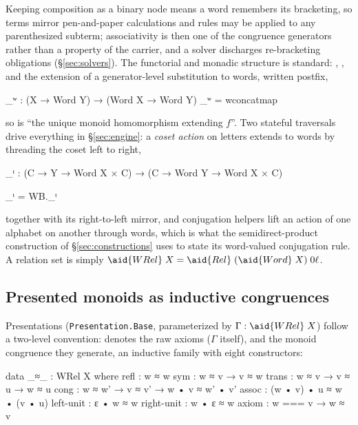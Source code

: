 Keeping composition as a binary node means a word remembers its
bracketing, so terms mirror pen-and-paper calculations and rules may be
applied to any parenthesized subterm; associativity is then one of the
congruence generators rather than a property of the carrier, and a
solver discharges re-bracketing obligations
(\S\ref{sec:solvers}).  The functorial and monadic structure is standard:
, , and the extension of a generator-level
substitution to words, written postfix,

\begin{code}
_ʷ : (X → Word Y) → (Word X → Word Y)
_ʷ = wconcatmap
\end{code}

\noindent so  is ``the unique monoid homomorphism extending $f$''.  Two
stateful traversals drive everything in \S\ref{sec:engine}: a \emph{coset
action} on letters extends to words by threading the coset left to right,

\begin{code}
_ᵗ : (C → Y → Word X × C) → (C → Word Y → Word X × C)
\end{code}
\begin{code}[hide]
_ᵗ = WB._ᵗ
\end{code}

\noindent together with its right-to-left mirror, and conjugation
helpers lift an action of one alphabet on another through words, which
is what the semidirect-product construction of \S\ref{sec:constructions}
uses to state its word-valued conjugation rule.  A relation set is simply
$\aid{WRel}\;X = \aid{Rel}\;(\aid{Word}\;X)\;0\ell$.

\subsection{Presented monoids as inductive congruences}\label{sec:presentations}

Presentations (\texttt{Presentation.Base}, parameterized by
$\Gamma : \aid{WRel}\;X$) follow a two-level convention:
\aid{{\_}==={\_}} denotes the raw axioms ($\Gamma$ itself), and
 the monoid congruence they generate,
an inductive family with eight constructors:

\begin{code}
data _≈_ : WRel X where
  refl  : w ≈ w
  sym   : w ≈ v → v ≈ w
  trans : w ≈ v → v ≈ u → w ≈ u
  cong  : w ≈ w' → v ≈ v' → w • v ≈ w' • v'
  assoc      : (w • v) • u ≈ w • (v • u)
  left-unit  : ε • w ≈ w
  right-unit : w • ε ≈ w
  axiom      : w === v → w ≈ v
\end{code}

